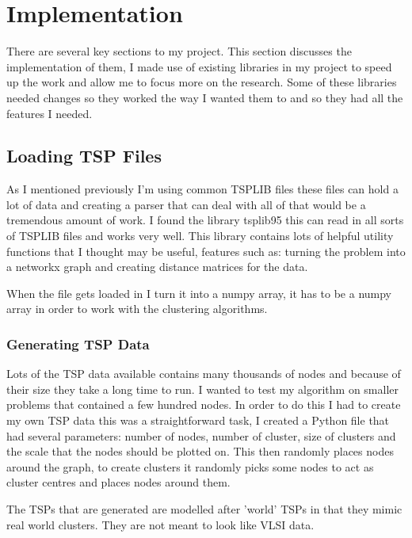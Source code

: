 \section{Implementation}

There are several key sections to my project. This section discusses the implementation of them, I made use of existing libraries in my project to speed up the work and allow me to focus more on the research. Some of these libraries needed changes so they worked the way I wanted them to and so they had all the features I needed. 

\subsection{Loading TSP Files}

As I mentioned previously I'm using common TSPLIB files these files can hold a lot of data and creating a parser that can deal with all of that would be a tremendous amount of work. I found the library tsplib95\cite{tsplib95} this can read in all sorts of TSPLIB files and works very well. This library contains lots of helpful utility functions that I thought may be useful, features such as: turning the problem into a networkx\cite{networkx} graph and creating distance matrices for the data.

When the file gets loaded in I turn it into a numpy\cite{numpy} array, it has to be a numpy array in order to work with the clustering algorithms. 

\subsubsection{Generating TSP Data}

Lots of the TSP data available contains many thousands of nodes and because of their size they take a long time to run. I wanted to test my algorithm on smaller problems that contained a few hundred nodes. In order to do this I had to create my own TSP data this was a straightforward task, I created a Python file that had several parameters: number of nodes, number of cluster, size of clusters and the scale that the nodes should be plotted on. This then randomly places nodes around the graph, to create clusters it randomly picks some nodes to act as cluster centres and places nodes around them.

The TSPs that are generated are modelled after 'world' TSPs in that they mimic real world clusters. They are not meant to look like VLSI data.


